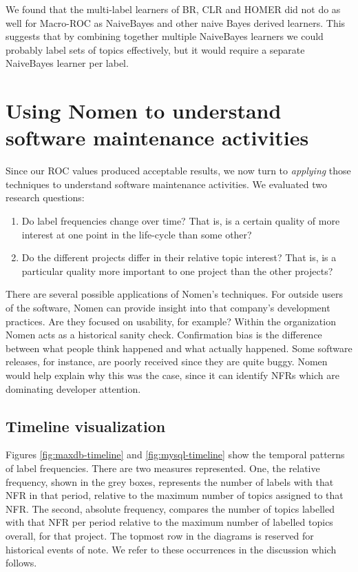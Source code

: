\documentclass[]{sig-alternate}
\begin{document}
We found that the multi-label learners of BR, CLR and HOMER did not do as well for Macro-ROC as NaiveBayes and other naive Bayes derived learners. 
This suggests that by combining together multiple NaiveBayes learners we could probably label sets of topics effectively, but it would require a separate NaiveBayes learner per label.


\section{Using \textbf{Nomen} to understand software maintenance activities} 
\label{sec:analysis}
Since our ROC values produced acceptable results, we now turn to \emph{applying} those techniques to understand software maintenance activities. We evaluated two research questions:
\begin{enumerate}
\item Do label frequencies change over time? That is, is a certain quality of more interest at one point in the life-cycle than some other? 
\item  Do the different projects differ in their relative topic interest? That is, is a particular quality more important to one project than the other projects?  
\end{enumerate}

There are several possible applications of \textsf{Nomen}'s techniques. 
For outside users of the software, \textsf{Nomen} can provide insight into that company's development practices. 
Are they focused on usability, for example?
Within the organization \textsf{Nomen} acts as a historical sanity check. 
Confirmation bias is the difference between what people think happened and what actually happened. 
Some software releases, for instance, are poorly received since they are quite buggy. 
\textsf{Nomen} would help explain why this was the case, since it can identify NFRs which are dominating developer attention.

\subsection{Timeline visualization}
Figures \ref{fig:maxdb-timeline} and \ref{fig:mysql-timeline} show the temporal patterns of label frequencies. 
There are two measures represented. 
One, the relative frequency, shown in the grey boxes, represents the number of labels with that NFR in that period, 
relative to the maximum number of topics assigned to that NFR. 
The second, absolute frequency, compares the number of topics labelled with that NFR per period 
relative to the maximum number of labelled topics overall, for that project. The topmost row in the diagrams is reserved for historical events of note. We refer to these occurrences in the discussion which follows.
\end{document}

